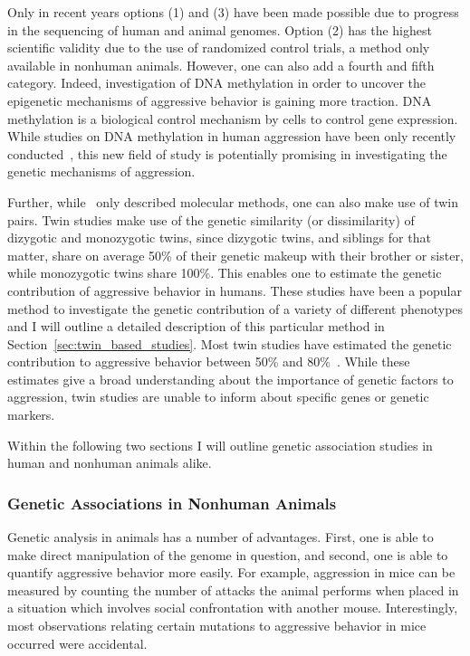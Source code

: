 Only in recent years options (1) and (3) have been made possible due to progress in the sequencing of human and animal genomes.
Option (2) has the highest scientific validity due to the use of randomized control trials, a method only available in nonhuman animals.
However, one can also add a fourth and fifth category.
Indeed, investigation of DNA methylation in order to uncover the epigenetic mechanisms of aggressive behavior is gaining more traction.
DNA methylation is a biological control mechanism by cells to control gene expression.
While studies on DNA methylation in human aggression have been only recently conducted~\cite{VanDongen2015a}, this new field of study is potentially promising in investigating the genetic mechanisms of aggression.

Further, while~\citet{Maxson2005} only described molecular methods, one can also make use of twin pairs.
Twin studies make use of the genetic similarity (or dissimilarity) of dizygotic and monozygotic twins, since dizygotic twins, and siblings for that matter, share on average 50\% of their genetic makeup with their brother or sister, while monozygotic twins share 100\%.
This enables one to estimate the genetic contribution of aggressive behavior in humans.
These studies have been a popular method to investigate the genetic contribution of a variety of different phenotypes and I will outline a detailed description of this particular method in Section~\ref{sec:twin_based_studies}. 
Most twin studies have estimated the genetic contribution to aggressive behavior between 50\% and 80\%~\cite{Porsch2016}.
While these estimates give a broad understanding about the importance of genetic factors  to aggression, twin studies are unable to inform about specific genes or genetic markers.

Within the following two sections I will outline genetic association studies in human and nonhuman animals alike.

\subsubsection{Genetic Associations in Nonhuman Animals}
\label{ssub:genetic_associations_in_animals}

Genetic analysis in animals has a number of advantages.
First, one is able to make direct manipulation of the genome in question, and second, one is able to quantify aggressive behavior more easily.
For example, aggression in mice can be measured by counting the number of attacks the animal performs when placed in a situation which involves social confrontation with another mouse.
Interestingly, most observations relating certain mutations to aggressive behavior in mice occurred were accidental.  

